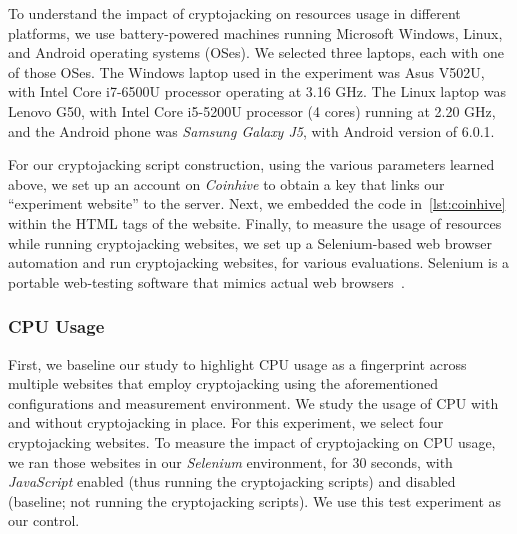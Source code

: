 \documentclass[acmlarge]{acmart}
\newcommand{\slx}{{\em Selenium}\xspace}
\newcommand{\ch}{{\em Coinhive}\xspace}
\newcommand{\js}{{\em JavaScript}\xspace}
\newcommand{\cj}{cryptojacking\xspace}
\begin{document}
To understand the impact of \cj on resources usage in different platforms, we use battery-powered machines running Microsoft Windows, Linux, and Android operating systems (OSes). We selected three laptops, each with one of those OSes. The Windows laptop used in the experiment was Asus V502U, with Intel Core i7-6500U processor operating at 3.16 GHz. The Linux laptop was Lenovo G50, with Intel Core i5-5200U processor (4 cores) running at 2.20 GHz, and the Android phone was {\em Samsung Galaxy J5}, with Android version of 6.0.1.
 






For our \cj script construction, using the various parameters learned above, we set up an account on \ch to obtain a key that links our ``experiment website'' to the server. Next, we embedded the code in~\autoref{lst:coinhive} within the HTML tags of the website. Finally, to measure the usage of resources while running \cj websites, we set up a Selenium-based web browser automation and run \cj websites, for various evaluations. Selenium is a portable web-testing software that mimics actual web browsers~\cite{bruns2009web,seleniumdocumentation}. 



\subsubsection{CPU Usage} 
First, we baseline our study to highlight CPU usage as a fingerprint across multiple websites that employ \cj using the aforementioned configurations and measurement environment. We study the usage of CPU with and without \cj in place. For this experiment, we select four \cj websites. To measure the impact of \cj on CPU usage, we ran those websites in our \slx environment, for 30 seconds, with \js enabled (thus running the \cj scripts) and disabled (baseline; not running the \cj scripts). We use this test experiment as our control. 
\end{document}
